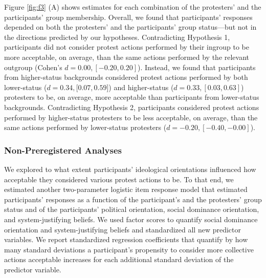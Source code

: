 \documentclass[twocolumn, 11pt, letterpaper]{article}
\begin{document}
Figure \ref{fig:f3} (A) shows estimates for each combination of the
protesters' and the participants' group membership. Overall, we found
that participants' responses depended on both the protesters' and the
participants' group status---but not in the directions predicted by our
hypotheses. Contradicting Hypothesis 1, participants did not consider
protest actions performed by their ingroup to be more acceptable, on
average, than the same actions performed by the relevant outgroup
(Cohen's \(d = 0.00, [-0.20, 0.20]\)). Instead, we found that
participants from higher-status backgrounds considered protest actions
performed by both lower-status (\(d = 0.34, [0.07, 0.59\){]}) and
higher-status (\(d = 0.33, [0.03, 0.63]\)) protesters to be, on average,
more acceptable than participants from lower-status backgrounds.
Contradicting Hypothesis 2, participants considered protest actions
performed by higher-status protesters to be less acceptable, on average,
than the same actions performed by lower-status protesters
(\(d = -0.20, [-0.40, -0.00]\)).

\hypertarget{non-preregistered-analyses}{%
\subsubsection{Non-Preregistered
Analyses}\label{non-preregistered-analyses}}

We explored to what extent participants' ideological orientations
influenced how acceptable they considered various protest actions to be.
To that end, we estimated another two-parameter logistic item response
model that estimated participants' responses as a function of the
participant's and the protesters' group status and of the participants'
political orientation, social dominance orientation, and
system-justifying beliefs. We used factor scores to quantify social
dominance orientation and system-justifying beliefs and standardized all
new predictor variables. We report standardized regression coefficients
that quantify by how many standard deviations a participant's propensity
to consider more collective actions acceptable increases for each
additional standard deviation of the predictor variable.
\end{document}
